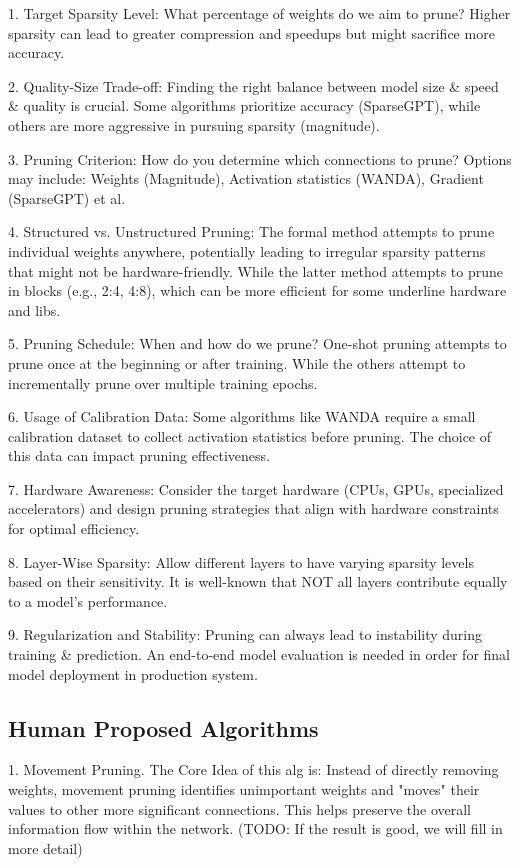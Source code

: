 \documentclass{article} %
\begin{document}
1. Target Sparsity Level: What percentage of weights do we aim to prune? Higher sparsity can lead to greater compression and speedups but might sacrifice more accuracy.

2. Quality-Size Trade-off: Finding the right balance between model size \& speed \& quality is crucial. Some algorithms prioritize accuracy (SparseGPT), while others are more aggressive in pursuing sparsity (magnitude).

3. Pruning Criterion: How do you determine which connections to prune? Options may include: Weights (Magnitude), Activation statistics (WANDA), Gradient (SparseGPT) et al.

4. Structured vs. Unstructured Pruning: The formal method attempts to prune individual weights anywhere, potentially leading to irregular sparsity patterns that might not be hardware-friendly. While the latter method attempts to prune in blocks (e.g., 2:4, 4:8), which can be more efficient for some underline hardware and libs.

5. Pruning Schedule: When and how do we prune? One-shot pruning attempts to prune once at the beginning or after training. While the others attempt to incrementally prune over multiple training epochs.

6. Usage of Calibration Data: Some algorithms like WANDA require a small calibration dataset to collect activation statistics before pruning. The choice of this data can impact pruning effectiveness.

7. Hardware Awareness: Consider the target hardware (CPUs, GPUs, specialized accelerators) and design pruning strategies that align with hardware constraints for optimal efficiency.

8. Layer-Wise Sparsity: Allow different layers to have varying sparsity levels based on their sensitivity. It is well-known that NOT all layers contribute equally to a model's performance.

9. Regularization and Stability: Pruning can always lead to instability during training \& prediction. An end-to-end model evaluation is needed in order for final model deployment in production system.

\subsection{Human Proposed Algorithms}

1. Movement Pruning. The Core Idea of this alg is: Instead of directly removing weights, movement pruning identifies unimportant weights and "moves" their values to other more significant connections. This helps preserve the overall information flow within the network. (TODO: If the result is good, we will fill in more detail)
\end{document}
